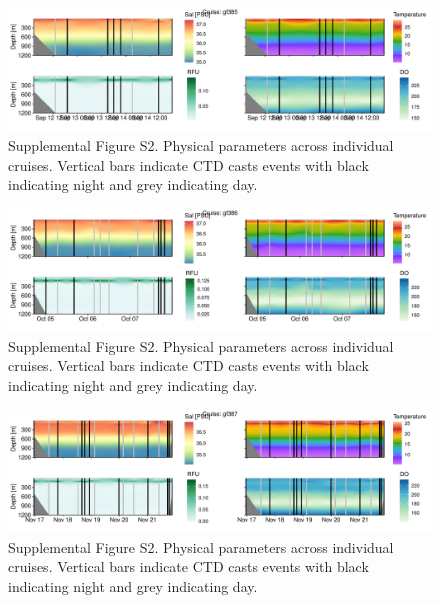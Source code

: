 \documentclass[
]{article}
\begin{document}
\begin{figure}

{\centering \includegraphics[width=1\textwidth,height=\textheight]{index_files/figure-pdf/unnamed-chunk-19-15.pdf}

}

\caption{Supplemental Figure S2. Physical parameters across individual
cruises. Vertical bars indicate CTD casts events with black indicating
night and grey indicating day.}

\end{figure}

\begin{figure}

{\centering \includegraphics[width=1\textwidth,height=\textheight]{index_files/figure-pdf/unnamed-chunk-19-16.pdf}

}

\caption{Supplemental Figure S2. Physical parameters across individual
cruises. Vertical bars indicate CTD casts events with black indicating
night and grey indicating day.}

\end{figure}

\begin{figure}

{\centering \includegraphics[width=1\textwidth,height=\textheight]{index_files/figure-pdf/unnamed-chunk-19-17.pdf}

}

\caption{Supplemental Figure S2. Physical parameters across individual
cruises. Vertical bars indicate CTD casts events with black indicating
night and grey indicating day.}

\end{figure}
\end{document}
